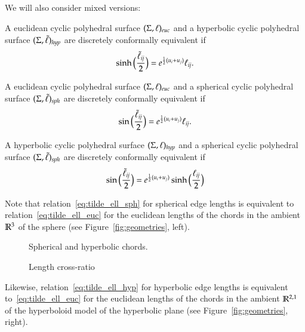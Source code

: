 \documentclass[Thesis]{subfiles}
\begin{document}
\begin{definition}
We will also consider mixed versions: 
\begin{compactitem}
\item A euclidean cyclic polyhedral surface $(\Sigma,\ell)_{\euc}$ and a
  hyperbolic cyclic polyhedral surface $(\Sigma,\tilde{\ell})_{\mathit{hyp}}$ are
  discretely conformally equivalent if
  \begin{equation}
    \label{eq:tilde_ell_hyp_euc}
    \sinh\Big(\frac{\tilde{\ell}_\mathit{ij}}{2}\Big)
    = e^{\frac{1}{2}(u_{i}+u_{j})}\ell_\mathit{ij}.
  \end{equation}
\item A euclidean cyclic polyhedral surface $(\Sigma,\ell)_{\euc}$ and a spherical cyclic
  polyhedral surface $(\Sigma,\tilde{\ell})_{\mathit{sph}}$ are discretely conformally
  equivalent if
  \begin{equation}\label{eq:tilde_ell_sph_euc}
    \sin\Big(\frac{\tilde{\ell}_\mathit{ij}}{2}\Big)
    = e^{\frac{1}{2}(u_{i}+u_{j})}\ell_\mathit{ij}.
  \end{equation}
\item A hyperbolic cyclic polyhedral surface $(\Sigma,\ell)_{\mathit{hyp}}$ and a spherical cyclic
  polyhedral surface $(\Sigma,\tilde{\ell})_{\mathit{sph}}$ are discretely conformally
  equivalent if
  \begin{equation}\label{eq:tilde_ell_sph_hyp}
    \sin\Big(\frac{\tilde{\ell}_\mathit{ij}}{2}\Big)
    = e^{\frac{1}{2}(u_{i}+u_{j})}\sinh\Big(\frac{\ell_\mathit{ij}}{2}\Big)
  \end{equation}
\end{compactitem}
\end{definition}

\begin{remark}
  \label{rem:chords}
  Note that relation~\eqref{eq:tilde_ell_sph} for spherical edge
  lengths is equivalent to relation~\eqref{eq:tilde_ell_euc} for the
  euclidean lengths of the chords in the ambient $\mathbb R^{3}$ of the
  sphere (see Figure~\ref{fig:geometries}, left).
  \begin{figure}
    \begin{minipage}[b]{0.6\linewidth}
      \centering \resizebox{\textwidth}{!}{
        
         }
      \caption{Spherical and hyperbolic chords.}
      \label{fig:geometries}
    \end{minipage}
    \hfill
    \begin{minipage}[b]{0.33\linewidth}
      \centering
      
      \caption{Length cross-ratio}
      \label{fig:lcr}
    \end{minipage}
  \end{figure}
  Likewise, relation~\eqref{eq:tilde_ell_hyp} for hyperbolic edge
  lengths is equivalent to~\eqref{eq:tilde_ell_euc} for the euclidean
  lengths of the chords in the ambient $\mathbb R^{2,1}$ of the hyperboloid
  model of the hyperbolic plane (see Figure~\ref{fig:geometries},
  right).
\end{remark}
\end{document}
